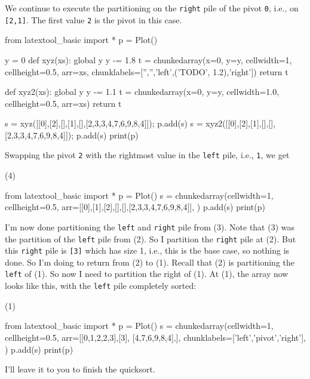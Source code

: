 We continue to execute the partitioning on the \verb!right! pile 
of the pivot \verb!0!,
i.e., on \verb![2,1]!.
The first value \verb!2! is the pivot in this case.
{\small
\begin{python}
from latextool_basic import *
p = Plot()

y = 0
def xyz(xs):
    global y
    y -= 1.8
    t = chunkedarray(x=0, y=y,
                        cellwidth=1, 
                        cellheight=0.5,
                        arr=xs,
                        chunklabels=['','','left',('TODO', 1.2),'right'])
    return t

def xyz2(xs):
    global y
    y -= 1.1
    t = chunkedarray(x=0, y=y,
                        cellwidth=1.0, 
                        cellheight=0.5,
                        arr=xs)
    return t

s = xyz([[0],[2],[],[1],[],[2,3,3,4,7,6,9,8,4]]); p.add(s)
s = xyz2([[0],[2],[1],[],[],[2,3,3,4,7,6,9,8,4]]); p.add(s)
print(p)
\end{python}
}


Swapping the pivot \verb!2! 
with the rightmost value in the \verb!left! pile,
i.e., \verb!1!, we get
\begin{center}
(4)
\end{center}
\begin{python}
from latextool_basic import *
p = Plot()
s = chunkedarray(cellwidth=1, 
                   cellheight=0.5,
                   arr=[[0],[1],[2],[],[],[2,3,3,4,7,6,9,8,4]],
)
p.add(s)
print(p)
\end{python}
I'm now done partitioning the \verb!left! and \verb!right! pile
from (3).
Note that (3) was the partition of the \verb!left! pile from (2).
So I partition the \verb!right! pile at (2).
But this \verb!right! pile is \verb![3]! which has size 1, i.e., 
this is the base case, so nothing is done.
So I'm doing to return from (2) to (1).
Recall that (2) is partitioning the \verb!left! of (1).
So now I need to partition the right of (1).
At (1), the array now looks like this, with the \verb!left! pile 
completely sorted:
\begin{center}
(1)
\end{center}
\begin{python}
from latextool_basic import *
p = Plot()
s = chunkedarray(cellwidth=1,
                   cellheight=0.5,
                   arr=[[0,1,2,2,3],[3], [4,7,6,9,8,4],],
                   chunklabels=['left','pivot','right'],
)
p.add(s)
print(p)
\end{python}
I'll leave it to you to finish the quicksort.

